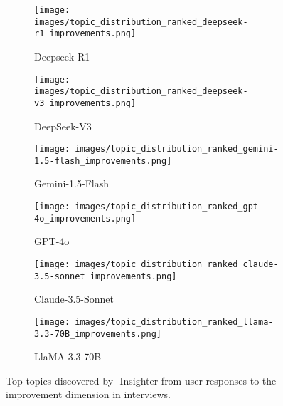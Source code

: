 \begin{figure*}[ht]
  \centering
  \begin{subfigure}[]{0.32\textwidth}
    \centering
    \texttt{[image: images/topic\_distribution\_ranked\_deepseek-r1\_improvements.png]}
     \vspace{-0.3cm}
    \caption{Deepseek-R1}
  \end{subfigure}
    \hfill
    \begin{subfigure}[]{0.32\textwidth}
    \centering
    \texttt{[image: images/topic\_distribution\_ranked\_deepseek-v3\_improvements.png]}
     \vspace{-0.3cm}
    \caption{DeepSeek-V3}
  \end{subfigure}
    \hfill
  \begin{subfigure}[]{0.32\textwidth}
    \centering
    \texttt{[image: images/topic\_distribution\_ranked\_gemini-1.5-flash\_improvements.png]}
     \vspace{-0.3cm}
    \caption{Gemini-1.5-Flash}
  \end{subfigure}
  \begin{subfigure}[]{0.32\textwidth}
    \centering
    \texttt{[image: images/topic\_distribution\_ranked\_gpt-4o\_improvements.png]}
     \vspace{-0.3cm}
    \caption{GPT-4o}
  \end{subfigure}
    \hfill
    \begin{subfigure}[]{0.32\textwidth}
    \centering
    \texttt{[image: images/topic\_distribution\_ranked\_claude-3.5-sonnet\_improvements.png]}
     \vspace{-0.3cm}
    \caption{Claude-3.5-Sonnet}
  \end{subfigure}
    \hfill
  \begin{subfigure}[]{0.32\textwidth}
    \centering
    \texttt{[image: images/topic\_distribution\_ranked\_llama-3.3-70B\_improvements.png]}
    \vspace{-0.3cm}
    \caption{LlaMA-3.3-70B}
  \end{subfigure}
  \vspace{-0.3cm}
  \caption{Top topics discovered by \method-Insighter from user responses to the improvement dimension in interviews.\label{fig:improve_topics_by_llm}}
\end{figure*}